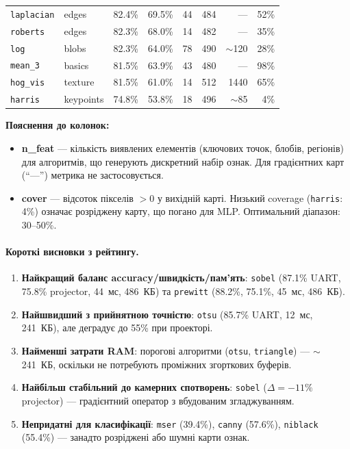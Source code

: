 \documentclass[a4paper,12pt]{article}
\begin{document}
\begin{table}[H]
\begin{tabular}{@{}l l c c r r r r@{}}
		\texttt{laplacian}       & edges        & 82.4\% & 69.5\% & 44   & 484  & ---    & 52\% \\
		\texttt{roberts}         & edges        & 82.3\% & 68.0\% & 14   & 482  & ---    & 35\% \\
		\texttt{log}             & blobs        & 82.3\% & 64.0\% & 78   & 490  & $\sim$120 & 28\% \\
		\texttt{mean\_3}         & basics       & 81.5\% & 63.9\% & 43   & 480  & ---    & 98\% \\
		\texttt{hog\_vis}        & texture      & 81.5\% & 61.0\% & 14   & 512  & 1440   & 65\% \\
		\texttt{harris}          & keypoints    & 74.8\% & 53.8\% & 18   & 496  & $\sim$85  & 4\% \\
		\bottomrule
	\end{tabular}
\end{table}

\textbf{Пояснення до колонок:}
\begin{itemize}
	\item \textbf{n\_feat} --- кількість виявлених елементів (ключових точок, блобів, регіонів) для алгоритмів, що генерують дискретний набір ознак. Для градієнтних карт (``---'') метрика не застосовується.
	\item \textbf{cover} --- відсоток пікселів $>0$ у вихідній карті. Низький coverage (\texttt{harris}: 4\%) означає розріджену карту, що погано для MLP. Оптимальний діапазон: 30--50\%.
\end{itemize}

\paragraph{Короткі висновки з рейтингу.}
\begin{enumerate}
	\item \textbf{Найкращий баланс accuracy/швидкість/пам'ять}: \texttt{sobel} (87.1\% UART, 75.8\% projector, 44~мс, 486~КБ) та \texttt{prewitt} (88.2\%, 75.1\%, 45~мс, 486~КБ).
	\item \textbf{Найшвидший з прийнятною точністю}: \texttt{otsu} (85.7\% UART, 12~мс, 241~КБ), але деградує до 55\% при проекторі.
	\item \textbf{Найменші затрати RAM}: порогові алгоритми (\texttt{otsu}, \texttt{triangle}) --- $\sim$241~КБ, оскільки не потребують проміжних згорткових буферів.
	\item \textbf{Найбільш стабільний до камерних спотворень}: \texttt{sobel} ($\Delta=-11\%$ projector) --- градієнтний оператор з вбудованим згладжуванням.
	\item \textbf{Непридатні для класифікації}: \texttt{mser} (39.4\%), \texttt{canny} (57.6\%), \texttt{niblack} (55.4\%) --- занадто розріджені або шумні карти ознак.
\end{enumerate}
\end{document}
